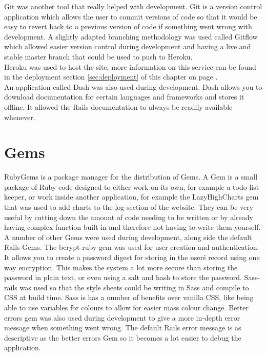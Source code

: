 Git was another tool that really helped with development. Git is a version control application which allows the user to commit versions of code so that it would be easy to revert back to a previous version of code if something went wrong with development. A slightly adapted branching methodology was used called Gitflow \citep{gitflow:2010} which allowed easier version control during development and having a live and stable master branch that could be used to push to Heroku.\\

Heroku \citep{heroku:2007} was used to host the site, more information on this service can be found in the deployment section \ref{sec:deployment} of this chapter on page \pageref{sec:deployment}.\\

An application called Dash \citep{dash:2014} was also used during development. Dash allows you to download documentation for certain languages and frameworks and stores it offline. It allowed the Rails documentation to always be readily available whenever.

\section{Gems}
RubyGems \citep{rubygems:2009} is a package manager for the distribution of Gems. A Gem is a small package of Ruby code designed to either work on its own, for example a todo list keeper, or work inside another application, for example the LazyHighCharts gem that was used to add charts to the log section of the website. They can be very useful by cutting down the amount of code needing to be written or by already having complex function built in and therefore not having to write them yourself. A number of other Gems were used during development, along side the default Rails Gems. The bcrypt-ruby gem was used for user creation and authentication. It allows you to create a password digest for storing in the user\'s record using one way encryption. This makes the system a lot more secure than storing the password in plain text, or even using a salt and hash to store the password. Sass-rails was used so that the style sheets could be writing in Sass and compile to CSS at build time. Sass is has a number of benefits over vanilla CSS, like being able to use variables for colours to allow for easier mass colour change. Better errors gem was also used during development to give a more in-depth error message when something went wrong. The default Rails error message is as descriptive as the better errors Gem so it becomes a lot easier to debug the application.

